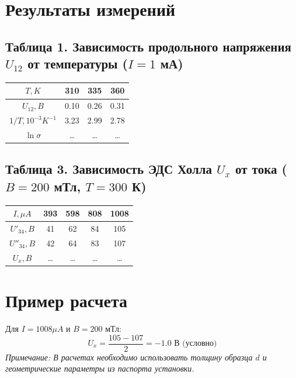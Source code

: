 \documentclass[a4paper,12pt]{article}
\begin{document}
\section{Результаты измерений}

\subsection{Таблица 1. Зависимость продольного напряжения $U_{12}$ от температуры ($I = 1$ мА)}
\begin{center}
\begin{tabular}{|c|c|c|c|}
\hline
$T, K$ & 310 & 335 & 360 \\ \hline
$U_{12}, B$ & 0.10 & 0.26 & 0.31 \\ \hline
$1/T, 10^{-3} K^{-1}$ & 3.23 & 2.99 & 2.78 \\ \hline
$\ln \sigma$ & \dots & \dots & \dots \\ \hline
\end{tabular}
\end{center}

\subsection{Таблица 3. Зависимость ЭДС Холла $U_x$ от тока ($B = 200$ мТл, $T = 300$ К)}
\begin{center}
\begin{tabular}{|c|c|c|c|c|}
\hline
$I, \mu A$ & 393 & 598 & 808 & 1008 \\ \hline
$U'_{34}, B$ & 41 & 62 & 84 & 105 \\ \hline
$U''_{34}, B$ & 42 & 64 & 83 & 107 \\ \hline
$U_x, B$ & \dots & \dots & \dots & \dots \\ \hline
\end{tabular}
\end{center}

\section{Пример расчета}
Для $I = 1008 \mu A$ и $B = 200$ мТл:
\begin{equation}
    U_x = \frac{105 - 107}{2} = -1.0 \text{ В (условно)}
\end{equation}
\textit{Примечание: В расчетах необходимо использовать толщину образца $d$ и геометрические параметры из паспорта установки.}
\end{document}
